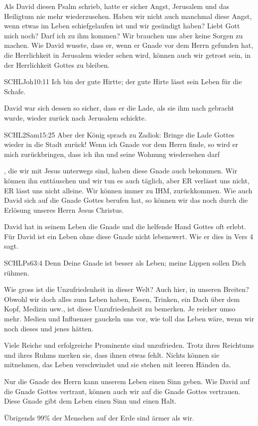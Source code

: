 \documentclass[14pt]{../../inc/mybib}
\begin{document}
    \begin{block}
        Als David diesen Psalm schrieb, hatte er sicher Angst, Jerusalem und das Heiligtum nie mehr wiederzusehen. Haben wir nicht auch manchmal diese Angst, wenn etwas im Leben schiefgelaufen ist und wir gesündigt haben? Liebt Gott mich  noch? Darf ich  zu ihm kommen? Wir brauchen uns aber keine Sorgen zu machen. Wie David wusste, dass er, wenn er Gnade vor dem Herrn gefunden hat, die Herrlichkeit in Jerusalem wieder sehen wird, können auch wir getrost sein, in der Herrlichkeit Gottes zu bleiben. 
          \begin{bibelbox}{SCHL}{Joh}{10:11}
            Ich bin der gute Hirtte; der gute Hirte lässt sein Leben für die Schafe.
        \end{bibelbox}
        David war sich dessen so sicher, dass er die Lade, als sie ihm nach gebracht wurde, wieder zurück nach Jerusalem schickte.
        \begin{bibelbox}{SCHL}{2Sam}{15:25}
            Aber der König sprach zu Zadiok: Bringe die Lade Gottes wieder in die Stadt zurück! Wenn ich Gnade vor dem Herrn finde, so wird er mich zurückbringen, dass ich ihn und seine Wohnung wiedersehen darf
        \end{bibelbox}
        , die wir mit Jesus unterwegs sind, haben diese Gnade auch bekommen. Wir können ihn enttäuschen und wir tun es auch täglich, aber ER verlässt uns nicht, ER lässt uns nicht alleine. Wir können immer zu IHM,  zurückkommen. Wie auch David sich auf die Gnade Gottes berufen hat, so können wir das noch  durch die Erlösung unseres Herrn Jesus Christus.
    \end{block}
    \begin{block}
        David hat in seinem Leben die Gnade und die helfende Hand Gottes oft erlebt. Für David ist ein Leben ohne diese Gnade nicht lebenswert. Wie er dies in Vers 4 sagt.
        \begin{bibelbox}{SCHL}{Ps}{63:4}
            Denn Deine Gnade ist besser als Leben; meine Lippen sollen Dich rühmen.
        \end{bibelbox}
        Wie gross ist die Unzufriedenheit in dieser Welt? Auch hier, in unseren Breiten? Obwohl wir doch alles zum Leben haben, Essen, Trinken, ein Dach über dem Kopf, Medizin usw., ist diese Unzufriedenheit zu bemerken. Je reicher umso mehr. Medien und Influenzer gauckeln uns vor, wie toll das Leben wäre, wenn wir noch dieses und jenes hätten.
        
        Viele Reiche und erfolgreiche Prominente sind unzufrieden. Trotz ihres Reichtums und ihres Ruhms merken sie, dass ihnen etwas fehlt. Nichts können sie mitnehmen, das Leben verschwindet und sie stehen mit leeren Händen da.
        
        Nur die Gnade des Herrn kann unserem Leben einen Sinn geben. Wie David auf die Gnade Gottes vertraut, können auch wir auf die Gnade Gottes vertrauen. Diese Gnade gibt dem Leben einen Sinn und einen Halt.

        Übrigends 99\% der Menschen auf der Erde sind ärmer als wir.
    \end{block}
\end{document}
